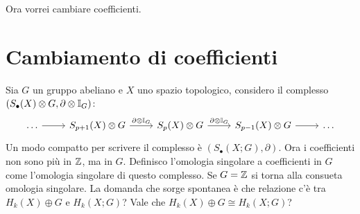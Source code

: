 Ora vorrei cambiare coefficienti.

\section{Cambiamento di coefficienti}

Sia $ G $ un gruppo abeliano e $ X $ uno spazio topologico, considero il complesso
$ (S_\bullet(X) \otimes G, \partial \otimes \mathbb{I}_{G}) $:
\[
  \begin{tikzcd}
    \dots \rar & S_{p+1}(X) \otimes G \rar{\partial \otimes \Id{G}} & S_p(X) \otimes G \rar{\partial \otimes \Id{G}} & S_{p-1}(X) \otimes G \rar & \dots
  \end{tikzcd}
\]
Un modo compatto per scrivere il complesso è $ (S_\bullet(X;G), \partial) $. Ora i
coefficienti non sono più in $ \mathbb{Z} $, ma in $ G $. Definisco l'omologia singolare
a coefficienti in $ G $ come l'omologia singolare di questo complesso. Se
$ G = \mathbb{Z} $ si torna alla consueta omologia singolare. La domanda che sorge spontanea è
che relazione c'è tra $ H_k(X) \oplus G $ e $ H_k(X;G) $? Vale che $ H_k(X) \oplus G \cong H_k(X;G) $?

